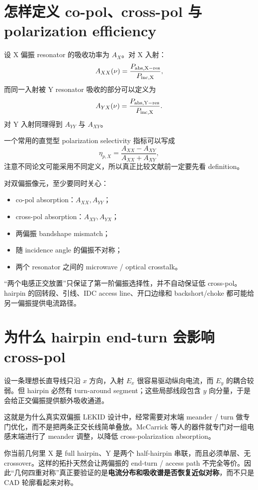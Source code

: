 \documentclass[11pt,a4paper,openany]{ctexrep}
\begin{document}
\section{怎样定义 co-pol、cross-pol 与 polarization efficiency}

设 X 偏振 resonator 的吸收功率为 $A_X$。对 X 入射：
\[
A_{XX}(\nu)=\frac{P_{\rm abs,X-res}}{P_{\rm inc,X}},
\]
而同一入射被 Y resonator 吸收的部分可以定义为
\[
A_{YX}(\nu)=\frac{P_{\rm abs,Y-res}}{P_{\rm inc,X}}.
\]
对 Y 入射同理得到 $A_{YY}$ 与 $A_{XY}$。

一个常用的直觉型 polarization selectivity 指标可以写成
\[
\eta_{p,X}=\frac{A_{XX}-A_{XY}}{A_{XX}+A_{XY}},
\]
注意不同论文可能采用不同定义，所以真正比较文献前一定要先看 definition。

对双偏振像元，至少要同时关心：
\begin{itemize}
  \item co-pol absorption：$A_{XX},A_{YY}$；
  \item cross-pol absorption：$A_{XY},A_{YX}$；
  \item 两偏振 bandshape mismatch；
  \item 随 incidence angle 的偏振不对称；
  \item 两个 resonator 之间的 microwave / optical crosstalk。
\end{itemize}

\begin{mistakebox}
“两个电感正交放置”只保证了第一阶偏振选择性，并不自动保证低 cross-pol。hairpin 的回转段、引线、IDC access line、开口边缘和 backshort/choke 都可能给另一偏振提供电流路径。
\end{mistakebox}

\section{为什么 hairpin end-turn 会影响 cross-pol}

设一条理想长直导线只沿 $x$ 方向，入射 $E_x$ 很容易驱动纵向电流，而 $E_y$ 的耦合较弱。但 hairpin 必然有 turn-around segment；这些局部线段包含 $y$ 向分量，于是会给正交偏振提供额外吸收通道。

这就是为什么真实双偏振 LEKID 设计中，经常需要对末端 meander / turn 做专门优化，而不是把两条正交长线简单叠放。McCarrick 等人的器件就专门对一组电感末端进行了 meander 调整，以降低 cross-polarization absorption。

\begin{projectbox}
你当前几何里 X 是 full hairpin、Y 是两个 half-hairpin 串联，而且必须单层、无 crossover。这样的拓扑天然会让两偏振的 end-turn / access path 不完全等价。因此“几何四重对称”真正要验证的是\textbf{电流分布和吸收谱是否恢复近似对称}，而不只是 CAD 轮廓看起来对称。
\end{projectbox}
\end{document}
